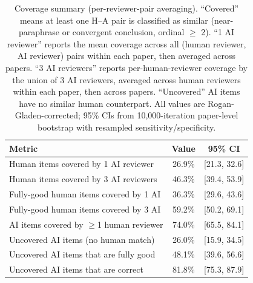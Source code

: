\begin{table}[t]
\centering
\fontsize{8}{10}\selectfont
\begin{tabular}{l c c}
\toprule
\textbf{Metric} & \textbf{Value} & \textbf{95\% CI} \\
\midrule
Human items covered by 1 AI reviewer & 26.9\% & [21.3, 32.6] \\
Human items covered by 3 AI reviewers & 46.3\% & [39.4, 53.9] \\
Fully-good human items covered by 1 AI & 36.3\% & [29.6, 43.6] \\
Fully-good human items covered by 3 AI & 59.2\% & [50.2, 69.1] \\
\midrule
AI items covered by $\geq$1 human reviewer & 74.0\% & [65.5, 84.1] \\
\midrule
Uncovered AI items (no human match) & 26.0\% & [15.9, 34.5] \\
Uncovered AI items that are fully good & 48.1\% & [39.6, 56.6] \\
Uncovered AI items that are correct & 81.8\% & [75.3, 87.9] \\
\bottomrule
\end{tabular}
\caption{Coverage summary (per-reviewer-pair averaging). ``Covered'' means at least one H--A pair is classified as similar (near-paraphrase or convergent conclusion, ordinal $\geq$ 2). ``1 AI reviewer'' reports the mean coverage across all (human reviewer, AI reviewer) pairs within each paper, then averaged across papers. ``3 AI reviewers'' reports per-human-reviewer coverage by the union of 3 AI reviewers, averaged across human reviewers within each paper, then across papers. ``Uncovered'' AI items have no similar human counterpart. All values are Rogan-Gladen-corrected; 95\% CIs from 10{,}000-iteration paper-level bootstrap with resampled sensitivity/specificity.}
\label{tab:coverage-summary}
\end{table}
